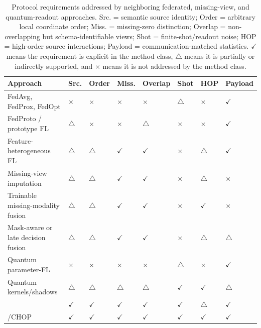 \begin{table}[t]
\centering
\caption{Protocol requirements addressed by neighboring federated, missing-view, and quantum-readout approaches. Src. = semantic source identity; Order = arbitrary local coordinate order; Miss. = missing-zero distinction; Overlap = non-overlapping but schema-identifiable views; Shot = finite-shot/readout noise; HOP = high-order source interactions; Payload = communication-matched statistics. \(\checkmark\) means the requirement is explicit in the method class, \(\triangle\) means it is partially or indirectly supported, and \(\times\) means it is not addressed by the method class.}
\label{tab:method-positioning}
\scriptsize
\setlength{\tabcolsep}{2pt}
\begin{tabular}{p{}YYYYYYY}
\toprule
Approach & Src. & Order & Miss. & Overlap & Shot & HOP & Payload \\
\midrule
FedAvg, FedProx, FedOpt & \(\times\) & \(\times\) & \(\times\) & \(\times\) & \(\triangle\) & \(\times\) & \(\checkmark\) \\
FedProto / prototype FL & \(\triangle\) & \(\times\) & \(\times\) & \(\triangle\) & \(\times\) & \(\times\) & \(\checkmark\) \\
Feature-heterogeneous FL & \(\triangle\) & \(\triangle\) & \(\checkmark\) & \(\checkmark\) & \(\times\) & \(\triangle\) & \(\checkmark\) \\
Missing-view imputation & \(\triangle\) & \(\triangle\) & \(\checkmark\) & \(\checkmark\) & \(\times\) & \(\triangle\) & \(\times\) \\
Trainable missing-modality fusion & \(\triangle\) & \(\triangle\) & \(\checkmark\) & \(\checkmark\) & \(\times\) & \(\checkmark\) & \(\times\) \\
Mask-aware or late decision fusion & \(\triangle\) & \(\triangle\) & \(\checkmark\) & \(\checkmark\) & \(\times\) & \(\triangle\) & \(\triangle\) \\
Quantum parameter-FL & \(\times\) & \(\times\) & \(\times\) & \(\times\) & \(\triangle\) & \(\times\) & \(\checkmark\) \\
Quantum kernels/shadows & \(\triangle\) & \(\triangle\) & \(\triangle\) & \(\triangle\) & \(\checkmark\) & \(\checkmark\) & \(\triangle\) \\
\method{} & \(\checkmark\) & \(\checkmark\) & \(\checkmark\) & \(\checkmark\) & \(\checkmark\) & \(\triangle\) & \(\checkmark\) \\
\hopmethod{}/CHOP & \(\checkmark\) & \(\checkmark\) & \(\checkmark\) & \(\checkmark\) & \(\checkmark\) & \(\checkmark\) & \(\checkmark\) \\
\bottomrule
\end{tabular}
\end{table}
